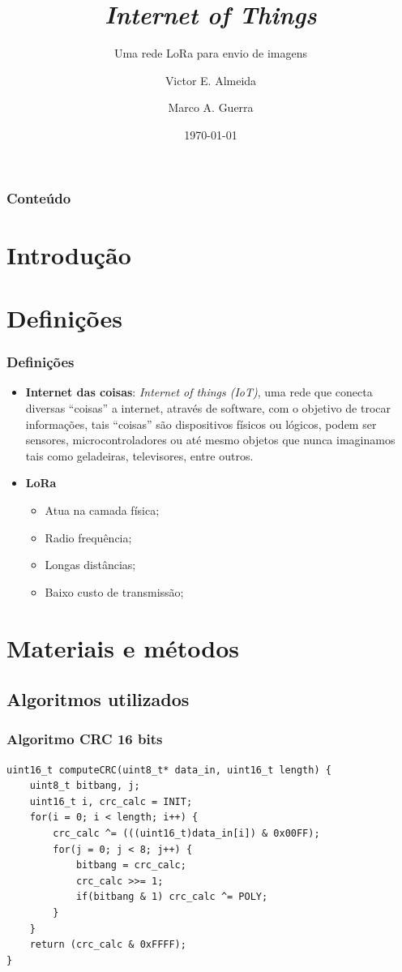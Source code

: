\documentclass[12pt]{beamer}
\author{Victor E. Almeida \and Marco A. Guerra}
\title{\textit{Internet of Things}}
\subtitle{Uma rede LoRa para envio de imagens}
\date{\today}
\institute{UNIOESTE}
\begin{document}
\frame{\titlepage}

\begin{frame}
\frametitle{Conteúdo}
\tableofcontents
\end{frame}

\section{Introdução}
\begin{frame}
    \frametitle{}
\end{frame}

\section{Definições}
\begin{frame}[allowframebreaks]
    \frametitle{Definições}
    \begin{itemize}
        \item\textbf{Internet das coisas}: \textit{Internet of things (IoT)}, uma rede que conecta
		diversas ``coisas'' a internet, através de software, com o objetivo de trocar informações,
		tais ``coisas'' são dispositivos físicos ou lógicos, podem ser sensores, microcontroladores ou até mesmo objetos que nunca
		imaginamos tais como geladeiras, televisores, entre outros.
        \framebreak
        \item\textbf{LoRa}
            \begin{itemize}
                \item Atua na camada física;
                \item Radio frequência;
                \item Longas distâncias;
                \item Baixo custo de transmissão;
            \end{itemize}
    \end{itemize}
\end{frame}

\section{Materiais e métodos}
\subsection{Algoritmos utilizados}

\begin{frame}[t,fragile]
    \frametitle{Algoritmo CRC 16 bits}
\begin{lstlisting}[basicstyle=\small]
uint16_t computeCRC(uint8_t* data_in, uint16_t length) {
    uint8_t bitbang, j;
    uint16_t i, crc_calc = INIT;
    for(i = 0; i < length; i++) {
        crc_calc ^= (((uint16_t)data_in[i]) & 0x00FF);
        for(j = 0; j < 8; j++) {
            bitbang = crc_calc;
            crc_calc >>= 1;
            if(bitbang & 1) crc_calc ^= POLY;
        }
    }
    return (crc_calc & 0xFFFF);
}
\end{lstlisting}
\end{frame}
\end{document}
